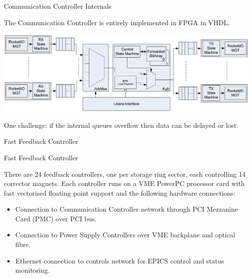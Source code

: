 \documentclass{beamer}
\begin{document}
%
\begin{frame}{Communication Controller Internals}

The Communication Controller is entirely implemented in FPGA in VHDL.

\medskip

\includegraphics[width=\linewidth]{cc-internal}

\medskip

One challenge: if the internal queues overflow then data can be delayed or lost.

\end{frame}


%
\begin{frame}{Fast Feedback Controller}
\end{frame}


%
\begin{frame}{Fast Feedback Controller}

There are 24 feedback controllers, one per storage ring sector, each controlling
14 corrector magnets.  Each controller runs on a VME PowerPC processor card with
fast vectorised floating point support and the following hardware connections:

\begin{itemize}
\item Connection to Communication Controller network through PCI Mezzanine Card
(PMC) over PCI bus.
\item Connection to Power Supply Controllers over VME backplane and optical
fibre.
\item Ethernet connection to controls network for EPICS control and status
monitoring.
\end{itemize}

\end{frame}
\end{document}
